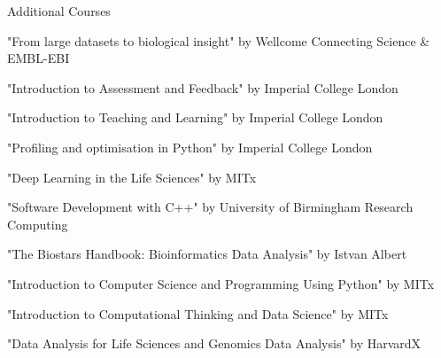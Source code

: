\documentclass{resume}
\begin{document}
\begin{rSection}{Additional Courses}

\item "From large datasets to biological insight" by Wellcome Connecting Science \& EMBL-EBI
\vspace{2pt plus 1pt minus 1pt}

\item "Introduction to Assessment and Feedback" by Imperial College London
\vspace{2pt plus 1pt minus 1pt}

\item "Introduction to Teaching and Learning" by Imperial College London
\vspace{2pt plus 1pt minus 1pt}

\item "Profiling and optimisation in Python" by Imperial College London
\vspace{2pt plus 1pt minus 1pt}

\item "Deep Learning in the Life Sciences" by MITx
\vspace{2pt plus 1pt minus 1pt}

\item "Software Development with C++" by University of Birmingham Research Computing
\vspace{2pt plus 1pt minus 1pt}

\item "The Biostars Handbook: Bioinformatics Data Analysis" by Istvan Albert
\vspace{2pt plus 1pt minus 1pt}

\item "Introduction to Computer Science and Programming Using Python" by MITx
\vspace{2pt plus 1pt minus 1pt}

\item "Introduction to Computational Thinking and Data Science" by MITx
\vspace{2pt plus 1pt minus 1pt}

\item "Data Analysis for Life Sciences and Genomics Data Analysis" by HarvardX

\end{rSection}
\end{document}
